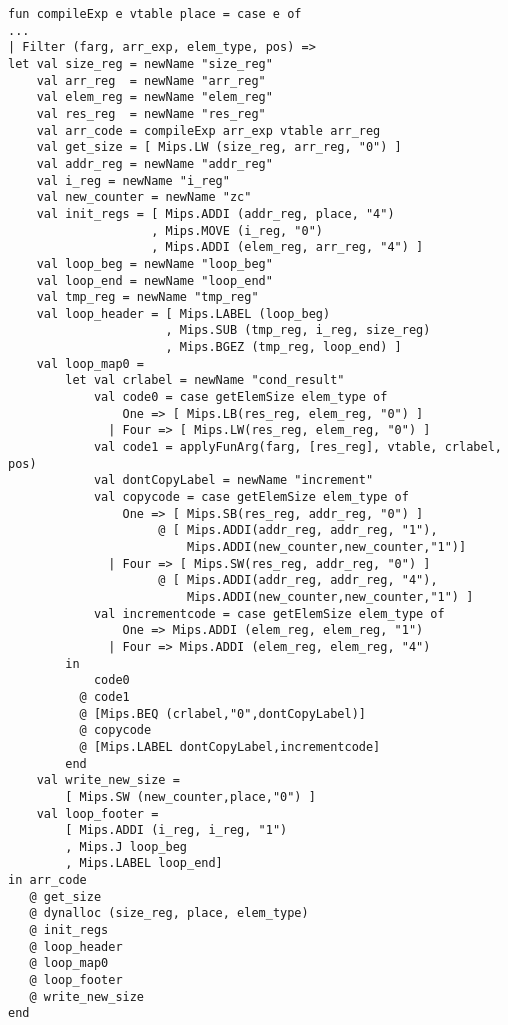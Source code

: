 \documentclass{article}
\begin{document}
\begin{lstlisting}
fun compileExp e vtable place = case e of
...
| Filter (farg, arr_exp, elem_type, pos) =>      
let val size_reg = newName "size_reg"
    val arr_reg  = newName "arr_reg"
    val elem_reg = newName "elem_reg"
    val res_reg  = newName "res_reg"
    val arr_code = compileExp arr_exp vtable arr_reg
    val get_size = [ Mips.LW (size_reg, arr_reg, "0") ]
    val addr_reg = newName "addr_reg"
    val i_reg = newName "i_reg"
    val new_counter = newName "zc"
    val init_regs = [ Mips.ADDI (addr_reg, place, "4")
                    , Mips.MOVE (i_reg, "0")
                    , Mips.ADDI (elem_reg, arr_reg, "4") ]
    val loop_beg = newName "loop_beg"
    val loop_end = newName "loop_end"
    val tmp_reg = newName "tmp_reg"
    val loop_header = [ Mips.LABEL (loop_beg)
                      , Mips.SUB (tmp_reg, i_reg, size_reg)
                      , Mips.BGEZ (tmp_reg, loop_end) ]
    val loop_map0 =
        let val crlabel = newName "cond_result"
            val code0 = case getElemSize elem_type of
                One => [ Mips.LB(res_reg, elem_reg, "0") ]
              | Four => [ Mips.LW(res_reg, elem_reg, "0") ]
            val code1 = applyFunArg(farg, [res_reg], vtable, crlabel, pos)
            val dontCopyLabel = newName "increment"
            val copycode = case getElemSize elem_type of
                One => [ Mips.SB(res_reg, addr_reg, "0") ]
                     @ [ Mips.ADDI(addr_reg, addr_reg, "1"),
                         Mips.ADDI(new_counter,new_counter,"1")]
              | Four => [ Mips.SW(res_reg, addr_reg, "0") ]
                     @ [ Mips.ADDI(addr_reg, addr_reg, "4"),
                         Mips.ADDI(new_counter,new_counter,"1") ]
            val incrementcode = case getElemSize elem_type of
                One => Mips.ADDI (elem_reg, elem_reg, "1")
              | Four => Mips.ADDI (elem_reg, elem_reg, "4")
        in    
            code0
          @ code1
          @ [Mips.BEQ (crlabel,"0",dontCopyLabel)]
          @ copycode
          @ [Mips.LABEL dontCopyLabel,incrementcode]
        end
    val write_new_size =
        [ Mips.SW (new_counter,place,"0") ]
    val loop_footer =
        [ Mips.ADDI (i_reg, i_reg, "1")
        , Mips.J loop_beg
        , Mips.LABEL loop_end]
in arr_code
   @ get_size
   @ dynalloc (size_reg, place, elem_type)
   @ init_regs
   @ loop_header
   @ loop_map0
   @ loop_footer
   @ write_new_size
end
\end{lstlisting}
\end{document}
